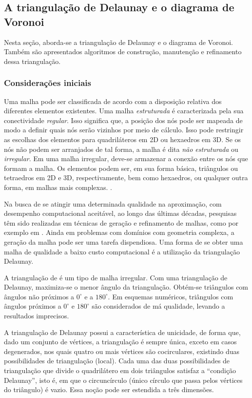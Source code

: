 \subsection{A triangulação de Delaunay e o diagrama de Voronoi}
\label{cap_triangulacao_delaunay}

Nesta seção, aborda-se a triangulação de Delaunay e o diagrama de Voronoi. Também são apresentados algoritmos de construção, manutenção e refinamento dessa triangulação.

\subsubsection{Considerações iniciais}

Uma malha pode ser classificada de acordo com a disposição relativa dos diferentes elementos existentes. Uma malha {\it estruturada} é caracterizada pela sua conectividade {\it regular}. Isso significa que, a posição dos nós pode ser mapeada de modo a definir quais nós serão vizinhos por meio de cálculo. Isso pode restringir as escolhas dos elementos para quadriláteros em 2D ou hexaedros em 3D. Se os nós não podem ser arranjados de tal forma, a malha é dita {\it não estruturada} ou {\it irregular}. Em uma malha irregular, deve-se armazenar a conexão entre os nós que formam a malha. Os elementos podem ser, em sua forma básica, triângulos ou tetraedros em 2D e 3D, respectivamente, bem como hexaedros, ou qualquer outra forma, em malhas mais complexas. \cite[p.~20]{Thompson1999}.

Na busca de se atingir uma determinada qualidade na aproximação, com desempenho computacional aceitável, ao longo das últimas décadas, pesquisas têm sido realizadas em técnicas de geração e refinamento de malhas, como por exemplo em . Ainda em problemas com domínios com geometria complexa, a geração da malha pode ser uma tarefa dispendiosa. Uma forma de se obter uma malha de qualidade a baixo custo computacional é a utilização da triangulação Delaunay. 

A triangulação de  é um tipo de malha irregular. Com uma triangulação de Delaunay, maximiza-se o menor ângulo da triangulação. Obtém-se triângulos com ângulos não próximos a $0^{\circ}$ e a $180^{\circ}$. Em esquemas numéricos, triângulos com ângulos próximos a $0^{\circ}$ e $180^{\circ}$ são considerados de má qualidade, levando a resultados imprecisos. 

A triangulação de Delaunay possui a característica de unicidade, de forma que, dado um conjunto de vértices, a triangulação é sempre única, exceto em casos degenerados, nos quais quatro ou mais vértices são cocirculares, existindo duas possibilidades de triangulação (local). Cada uma das duas possibilidades de triangulação que divide o quadrilátero em dois triângulos satisfaz a ``condição Delaunay'', isto é, em que o circuncírculo (único círculo que passa pelos vértices do triângulo) é vazio. Essa noção pode ser estendida a três dimensões.

